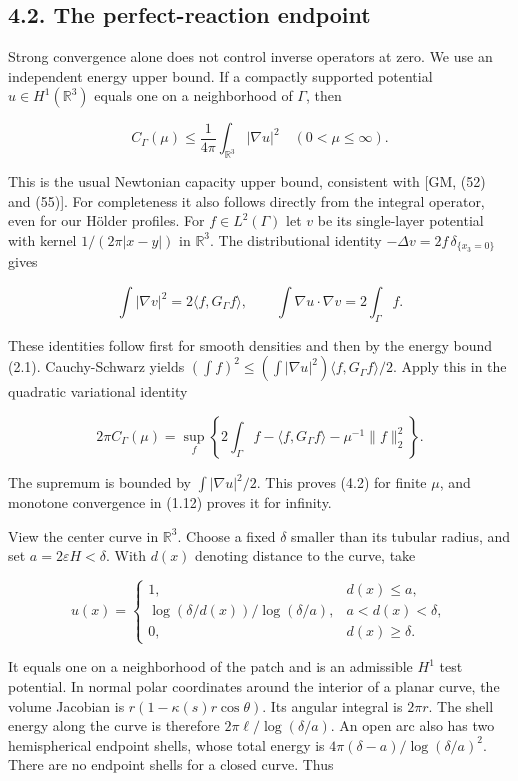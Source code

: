 \documentclass[11pt]{article}
\begin{document}
\subsection{4.2. The perfect-reaction
endpoint}\label{the-perfect-reaction-endpoint}

Strong convergence alone does not control inverse operators at zero. We
use an independent energy upper bound. If a compactly supported
potential \(u\in H^1(\mathbb R^3)\) equals one on a neighborhood of
\(\Gamma\), then

\[
C_\Gamma(\mu)\le\frac1{4\pi}\int_{\mathbb R^3}|\nabla u|^2
 \quad(0<\mu\le\infty).
\tag{4.2}
\]

This is the usual Newtonian capacity upper bound, consistent with {[}GM,
(52) and (55){]}. For completeness it also follows directly from the
integral operator, even for our Hölder profiles. For
\(f\in L^2(\Gamma)\) let \(v\) be its single-layer potential with kernel
\(1/(2\pi|x-y|)\) in \(\mathbb R^3\). The distributional identity
\(-\Delta v=2f\,\delta_{\{x_3=0\}}\) gives

\[
\int|\nabla v|^2=2\langle f,G_\Gamma f\rangle,
\qquad \int\nabla u\cdot\nabla v=2\int_\Gamma f.
\tag{4.3}
\]

These identities follow first for smooth densities and then by the
energy bound (2.1). Cauchy-Schwarz yields
\((\int f)^2\le(\int|\nabla u|^2)\langle f,G_\Gamma f\rangle/2\). Apply
this in the quadratic variational identity

\[
2\pi C_\Gamma(\mu)
 =\sup_f\left\{2\int_\Gamma f-\langle f,G_\Gamma f\rangle
                         -\mu^{-1}\|f\|_2^2\right\}.
\tag{4.4}
\]

The supremum is bounded by \(\int|\nabla u|^2/2\). This proves (4.2) for
finite \(\mu\), and monotone convergence in (1.12) proves it for
infinity.

View the center curve in \(\mathbb R^3\). Choose a fixed \(\delta\)
smaller than its tubular radius, and set \(a=2\varepsilon H<\delta\).
With \(d(x)\) denoting distance to the curve, take

\[
u(x)=\begin{cases}
1,&d(x)\le a,\\
\log(\delta/d(x))/\log(\delta/a),&a<d(x)<\delta,\\
0,&d(x)\ge\delta.
\end{cases}
\tag{4.5}
\]

It equals one on a neighborhood of the patch and is an admissible
\(H^1\) test potential. In normal polar coordinates around the interior
of a planar curve, the volume Jacobian is \(r(1-\kappa(s)r\cos\theta)\).
Its angular integral is \(2\pi r\). The shell energy along the curve is
therefore \(2\pi\ell/\log(\delta/a)\). An open arc also has two
hemispherical endpoint shells, whose total energy is
\(4\pi(\delta-a)/\log(\delta/a)^2\). There are no endpoint shells for a
closed curve. Thus
\end{document}
